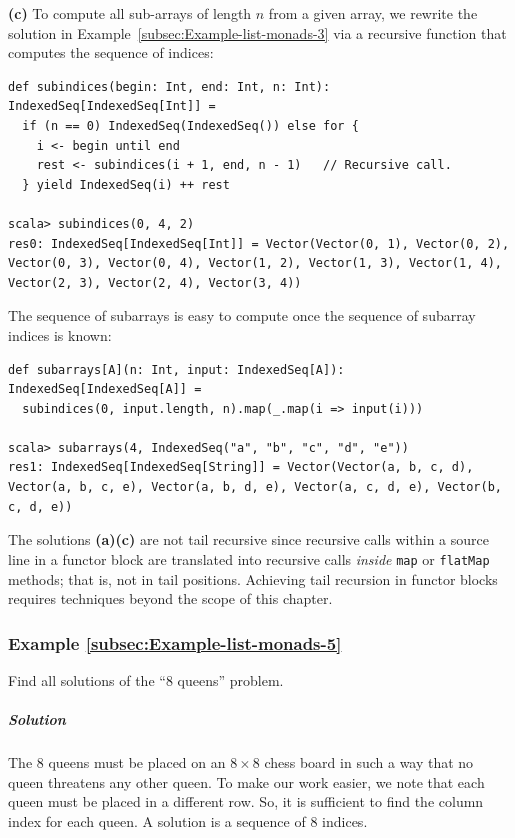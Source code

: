 \textbf{(c)} To compute all sub-arrays of length $n$ from a given
array, we rewrite the solution in Example~\ref{subsec:Example-list-monads-3}
via a recursive function that computes the sequence of indices:
\begin{lstlisting}
def subindices(begin: Int, end: Int, n: Int): IndexedSeq[IndexedSeq[Int]] =
  if (n == 0) IndexedSeq(IndexedSeq()) else for {
    i <- begin until end
    rest <- subindices(i + 1, end, n - 1)   // Recursive call.
  } yield IndexedSeq(i) ++ rest

scala> subindices(0, 4, 2)
res0: IndexedSeq[IndexedSeq[Int]] = Vector(Vector(0, 1), Vector(0, 2), Vector(0, 3), Vector(0, 4), Vector(1, 2), Vector(1, 3), Vector(1, 4), Vector(2, 3), Vector(2, 4), Vector(3, 4))
\end{lstlisting}
The sequence of subarrays is easy to compute once the sequence of
subarray indices is known: 
\begin{lstlisting}
def subarrays[A](n: Int, input: IndexedSeq[A]): IndexedSeq[IndexedSeq[A]] =
  subindices(0, input.length, n).map(_.map(i => input(i)))

scala> subarrays(4, IndexedSeq("a", "b", "c", "d", "e"))
res1: IndexedSeq[IndexedSeq[String]] = Vector(Vector(a, b, c, d), Vector(a, b, c, e), Vector(a, b, d, e), Vector(a, c, d, e), Vector(b, c, d, e))
\end{lstlisting}

The solutions \textbf{(a)}\textendash \textbf{(c)} are not tail recursive
since recursive calls within a source line in a functor block are
translated into recursive calls \emph{inside} \lstinline!map! or
\lstinline!flatMap! methods; that is, not in tail positions. Achieving
tail recursion in functor blocks requires techniques beyond the scope
of this chapter.

\subsubsection{Example \label{subsec:Example-list-monads-5}\ref{subsec:Example-list-monads-5}}

Find all solutions of the \textsf{``}$8$ queens\textsf{''} problem.

\subparagraph{Solution}

The $8$ queens must be placed on an $8\times8$ chess board in such
a way  that no queen threatens any other queen. To make our work easier,
we note that each queen must be placed in a different row. So, it
is sufficient to find the column index for each queen. A solution
is a sequence of $8$ indices.

